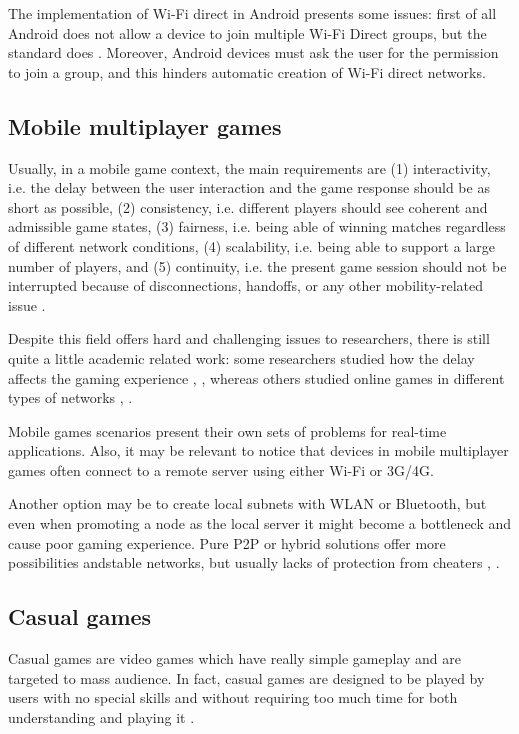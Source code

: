 The implementation of Wi-Fi direct in Android presents some issues: first of all
Android does not allow a device to join multiple Wi-Fi Direct groups,
but the standard does \cite{bib:android-wifidirect-limits}. Moreover, Android 
devices must ask the user for the permission to join a group, and this hinders 
automatic creation of Wi-Fi direct networks.

\subsection{Mobile multiplayer games}
Usually, in a mobile game context, the main requirements are (1)
interactivity, i.e. the delay between the user interaction and the game
response should be as short as possible, (2) consistency, i.e. different
players should see coherent and admissible game states, (3) fairness, i.e.
being able of winning matches regardless of different network conditions, (4)
scalability, i.e. being able to support a large number of players, and (5)
continuity, i.e. the present game session should not be interrupted because
of disconnections, handoffs, or any other mobility-related issue
\cite{bib:interactive-mobile-gaming}.

Despite this field offers hard and challenging issues to researchers, there is
still quite a little academic related work: some researchers studied how
the delay affects the gaming experience \cite{bib:impact-delay-multi},
\cite{bib:factors-multi}, whereas others studied online games in different
types of networks \cite{bib:interactive-mobile-gaming},
\cite{bib:survey-mobile-games}.

Mobile games scenarios present their own sets of problems for real-time
applications. Also, it may be relevant to notice that devices in mobile
multiplayer games often connect to a remote server using either Wi-Fi or 3G/4G.

Another option may be to create local subnets with WLAN or Bluetooth, but
even when promoting a node as the local server it might become a
bottleneck and cause poor gaming experience.
Pure P2P or hybrid solutions offer more possibilities andstable networks, 
but usually lacks of protection from cheaters
\cite{bib:can-mobile-gaming-be-improved}, \cite{bib:study-mobile-phone-sector}.

\subsection{Casual games}
Casual games are video games which have really simple gameplay and are
targeted to mass audience. In fact, casual games are designed to be played
by users with no special skills and without requiring too much time for both
understanding and playing it \cite{bib:mob-health-casual}.

